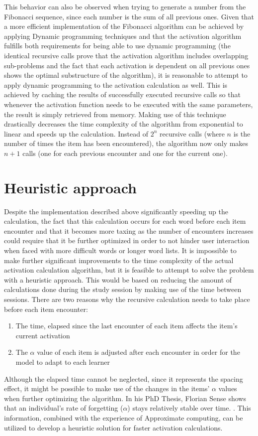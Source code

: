 \documentclass[a4paper]{report}
\begin{document}
This behavior can also be observed when trying to generate a number from the Fibonacci sequence, since each number is the sum of all previous ones. Given that a more efficient implementation of the Fibonacci algorithm can be achieved by applying Dynamic programming techniques and that the activation algorithm fulfills both requirements for being able to use dynamic programming (the identical recursive calls prove that the activation algorithm includes overlapping sub-problems and the fact that each activation is dependent on all previous ones shows the optimal substructure of the algorithm), it is reasonable to attempt to apply dynamic programming to the activation calculation as well. This is achieved by caching the results of successfully executed recursive calls so that whenever the activation function needs to be executed with the same parameters, the result is simply retrieved from memory. Making use of this technique drastically decreases the time complexity of the algorithm from exponential to linear and speeds up the calculation. Instead of $2^n$ recursive calls (where $n$ is the number of times the item has been encountered), the algorithm now only makes $n+1$ calls (one for each previous encounter and one for the current one).

\section{Heuristic approach}
Despite the implementation described above significantly speeding up the calculation, the fact that this calculation occurs for each word before each item encounter and that it becomes more taxing as the number of encounters increases could require that it be further optimized in order to not hinder user interaction when faced with more difficult words or longer word lists. It is impossible to make further significant improvements to the time complexity of the actual activation calculation algorithm, but it is feasible to attempt to solve the problem with a heuristic approach. This would be based on reducing the amount of calculations done during the study session by making use of the time between sessions. There are two reasons why the recursive calculation needs to take place before each item encounter:
\begin{enumerate}
    \item The time, elapsed since the last encounter of each item affects the item's current activation
    \item The $\alpha$ value of each item is adjusted after each encounter in order for the model to adapt to each learner
\end{enumerate}
Although the elapsed time cannot be neglected, since it represents the spacing effect, it might be possible to make use of the changes in the items' $\alpha$ values when further optimizing the algorithm. In his PhD Thesis, Florian Sense shows that an individual's rate of forgetting ($\alpha$) stays relatively stable over time. \citep{sense17}. This information, combined with the experience of Approximate computing, can be utilized to develop a heuristic solution for faster activation calculations.
\end{document}
